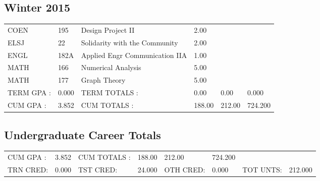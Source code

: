 \documentclass{article}\usepackage[T1]{fontenc}
\begin{document}
\subsection{Winter 2015}
\begin{tabular}{ l  l  l  l  l  l }
COEN&195&Design Project II&2.00&&\\
ELSJ&22&Solidarity with the Community&2.00&&\\
ENGL&182A&Applied Engr Communication IIA&1.00&&\\
MATH&166&Numerical Analysis&5.00&&\\
MATH&177&Graph Theory&5.00&&\\
\hline
TERM GPA :&0.000&TERM TOTALS :&0.00&0.00&0.000\\
CUM GPA :&3.852&CUM TOTALS :&188.00&212.00&724.200\\\end{tabular}
\subsection{Undergraduate Career Totals}
\begin{tabular}{ l  l  l  l  l  l  l  l }
CUM GPA :&3.852&CUM TOTALS :&188.00&212.00&724.200&&\\
TRN CRED:&0.000&TST CRED:&24.000&OTH CRED:&0.000&TOT UNTS:&212.000\\\end{tabular}
\end{document}
